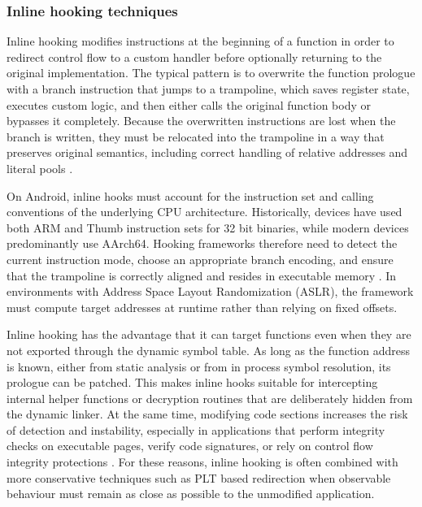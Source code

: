 \documentclass[11pt,a4paper]{report}
\renewcommand\_{{\textunderscore\allowbreak}}
\begin{document}
\subsubsection{Inline hooking techniques}

Inline hooking modifies instructions at the beginning of a function in order to redirect control flow to a custom handler before optionally returning to the original implementation. The typical pattern is to overwrite the function prologue with a branch instruction that jumps to a trampoline, which saves register state, executes custom logic, and then either calls the original function body or bypasses it completely. Because the overwritten instructions are lost when the branch is written, they must be relocated into the trampoline in a way that preserves original semantics, including correct handling of relative addresses and literal pools \cite{ronin2018hooking}.

On Android, inline hooks must account for the instruction set and calling conventions of the underlying CPU architecture. Historically, devices have used both ARM and Thumb instruction sets for 32 bit binaries, while modern devices predominantly use AArch64. Hooking frameworks therefore need to detect the current instruction mode, choose an appropriate branch encoding, and ensure that the trampoline is correctly aligned and resides in executable memory \cite{ronin2018hooking,kumar2023inviseal}. In environments with Address Space Layout Randomization (ASLR), the framework must compute target addresses at runtime rather than relying on fixed offsets.

Inline hooking has the advantage that it can target functions even when they are not exported through the dynamic symbol table. As long as the function address is known, either from static analysis or from in process symbol resolution, its prologue can be patched. This makes inline hooks suitable for intercepting internal helper functions or decryption routines that are deliberately hidden from the dynamic linker. At the same time, modifying code sections increases the risk of detection and instability, especially in applications that perform integrity checks on executable pages, verify code signatures, or rely on control flow integrity protections \cite{ronin2018hooking,kumar2023inviseal}. For these reasons, inline hooking is often combined with more conservative techniques such as PLT based redirection when observable behaviour must remain as close as possible to the unmodified application.
\end{document}

